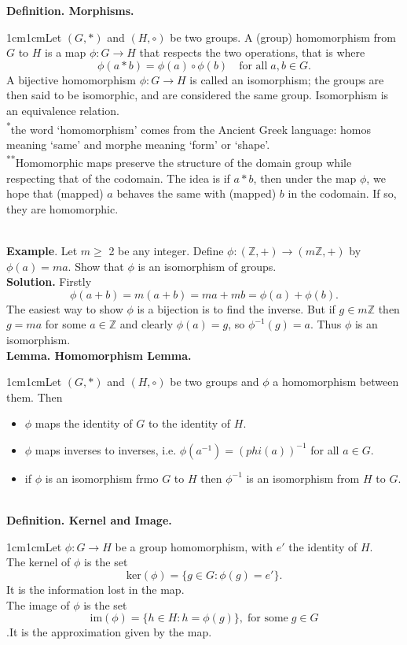 \documentclass{article}
\newcommand{\definition}[2]{\textbf{Definition. #1.}\begin{adjustwidth}{1cm}{1cm}#2\end{adjustwidth}}
\newcommand{\lemma}[2]{\textbf{Lemma. #1.}\begin{adjustwidth}{1cm}{1cm}#2\end{adjustwidth}}
\begin{document}
\definition{Morphisms}{Let $(G, *)$ and $(H, \circ)$ be two groups. A (group) homomorphism from $G$ to $H$ is a map $\phi : G \rightarrow H$ that respects the two operations, that is where \[\phi(a * b) = \phi(a) \circ \phi(b) \quad \text{for all} \; a,b \in G.\]A bijective homomorphism $\phi: G \rightarrow H$ is called an isomorphism; the groups are then said to be isomorphic, and are considered the same group. Isomorphism is an equivalence relation.\\[1\baselineskip]\textsuperscript{*}the word `homomorphism' comes from the Ancient Greek language: homos meaning `same' and morphe meaning `form' or `shape'.\\[1\baselineskip]\textsuperscript{**}Homomorphic maps preserve the structure of the domain group while respecting that of the codomain. The idea is if $a * b$, then under the map $\phi$, we hope that (mapped) $a$ behaves the same with (mapped) $b$ in the codomain. If so, they are homomorphic.}~\\
\textbf{Example}. Let $m \geq$ 2 be any integer. Define $\phi: (\mathbb{Z},+) \rightarrow (m\mathbb{Z},+)$ by $\phi(a) = ma$. Show that $\phi$ is an isomorphism of groups.\\
\textbf{Solution.} Firstly \[\phi(a+b)=m(a+b)=ma+mb=\phi(a)+\phi(b).\]The easiest way to show $\phi$ is a bijection is to find the inverse. But if $g \in m\mathbb{Z}$ then $g=ma$ for some $a \in \mathbb{Z}$ and clearly $\phi(a) = g$, so $\phi^{-1}(g) = a$. Thus $\phi$ is an isomorphism.\\[1\baselineskip]
\lemma{Homomorphism Lemma}{Let $(G, *)$ and $(H, \circ)$ be two groups and $\phi$ a homomorphism between them. Then \begin{itemize}\item $\phi$ maps the identity of $G$ to the identity of $H$.\item $\phi$ maps inverses to inverses, i.e. $\phi(a^{-1})=(phi(a))^{-1}$ for all $a \in G$.\item if $\phi$ is an isomorphism frmo $G$ to $H$ then $\phi^{-1}$ is an isomorphism from $H$ to $G$.\end{itemize}}~\\
\definition{Kernel and Image}{Let $\phi : G \rightarrow H$ be a group homomorphism, with $e'$ the identity of $H$.\\The kernel of $\phi$ is the set \[\text{ker}(\phi) = \{g \in G: \phi(g) = e' \}.\]It is the information lost in the map.\\The image of $\phi$ is the set \[\text{im}(\phi) = \{h \in H : h = \phi(g)\}, \; \text{for some} \; g \in G\].It is the approximation given by the map.}~\\
\end{document}

